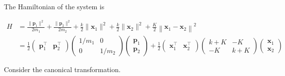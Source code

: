 \documentclass[a4paper,11pt]{article}
\begin{document}
The Hamiltonian of the system is

\begin{align}
    H &= \frac{\|\mathbf{p}_1\|^2}{2m_1}
    + \frac{\|\mathbf{p}_2\|^2}{2m_2}
    + \frac{k}{2}\|\mathbf{x}_1\|^2
    + \frac{k}{2}\|\mathbf{x}_2\|^2
    + \frac{K}{2}\left\|\mathbf{x}_1 - \mathbf{x}_2\right\|^2 \\
    &= \frac{1}{2}\begin{pmatrix}\mathbf p_1^\top & \mathbf p_2^\top\end{pmatrix}
    \begin{pmatrix}1/{m_1}& 0 \\ 0 & 1/{m_2}\end{pmatrix}
    \begin{pmatrix}\mathbf p_1 \\ \mathbf p_2\end{pmatrix}
    + \frac{1}{2}\begin{pmatrix}\mathbf x_1^\top & \mathbf x_2^\top\end{pmatrix}
    \begin{pmatrix}k + K& -K \\ -K & k + K\end{pmatrix}
    \begin{pmatrix}\mathbf x_1 \\ \mathbf x_2\end{pmatrix}
\end{align}

Consider the canonical transformation.
\end{document}
